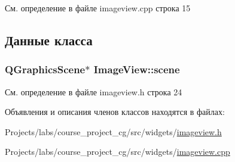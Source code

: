 См. определение в файле imageview.\+cpp строка 15



\subsection{Данные класса}
\subsubsection[{\texorpdfstring{scene}{scene}}]{\setlength{\rightskip}{0pt plus 5cm}Q\+Graphics\+Scene$\ast$ Image\+View\+::scene\hspace{0.3cm}{\ttfamily [private]}}\hypertarget{class_image_view_a371e669523a21ae10284613a0d84ff6b}{}\label{class_image_view_a371e669523a21ae10284613a0d84ff6b}


См. определение в файле imageview.\+h строка 24



Объявления и описания членов классов находятся в файлах\+:\begin{DoxyCompactItemize}
\item 
Projects/labs/course\+\_\+project\+\_\+cg/src/widgets/\hyperlink{imageview_8h}{imageview.\+h}\item 
Projects/labs/course\+\_\+project\+\_\+cg/src/widgets/\hyperlink{imageview_8cpp}{imageview.\+cpp}\end{DoxyCompactItemize}
